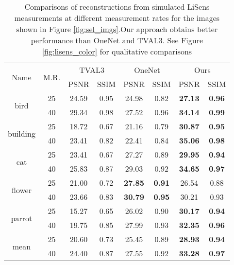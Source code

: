 \documentclass[journal,twoside]{IEEEtran}
\begin{document}
\begin{table}[!h]
\renewcommand{\arraystretch}{1.3}
\caption{Comparisons of reconstructions from simulated LiSens measurements at different measurement rates for the images shown in Figure \ref{fig:sel_imgs}.Our approach obtains better performance than OneNet and TVAL3. See Figure \ref{fig:lisens_color} for qualitative comparisons}
\label{table:licens_sim}
\begin{center}
\begin{tabular}{cccccccc}

\toprule
    \multirow{2}{*}{ Name}&\multirow{2}{*}{M.R.}&\multicolumn{2}{c}{TVAL3}&\multicolumn{2}{c}{OneNet}&\multicolumn{2}{c}{Ours}\\
    \cline{3-8} & &  PSNR & SSIM & PSNR & SSIM  & PSNR & SSIM  \\
\midrule 
 \multirow{2}{*}{bird} & 25 & 24.59 & 0.95 & 24.98 & 0.82 & \textbf{27.13} & \textbf{0.96} \\
& 40 & 29.34 & 0.98 & 27.52 & 0.96 & \textbf{34.14} & \textbf{0.99} \\
\midrule 
 \multirow{2}{*}{building} & 25 & 18.72 & 0.67 & 21.16 & 0.79 & \textbf{30.87} & \textbf{0.95} \\
& 40 & 23.41 & 0.82 & 22.41 & 0.84 & \textbf{35.06} & \textbf{0.98} \\
\midrule 
 \multirow{2}{*}{cat} &25 & 23.41 & 0.67 & 27.27 & 0.89 & \textbf{29.95} & \textbf{0.94} \\
& 40 & 25.83 & 0.87 & 29.03 & 0.92 & \textbf{34.65} & \textbf{0.97} \\
\midrule 
 \multirow{2}{*}{flower} &25 & 21.00 & 0.72 & \textbf{27.85} & \textbf{0.91} & 26.54 & 0.88 \\
& 40 & 23.66 & 0.83 & \textbf{30.79} & \textbf{0.95} & 30.21 & 0.93 \\
\midrule 
 \multirow{2}{*}{parrot} &25 & 15.27 & 0.65 & 26.02 & 0.90 & \textbf{30.17} & \textbf{0.94} \\
& 40 & 19.75 & 0.85 & 27.99 & 0.93 & \textbf{32.35} & \textbf{0.96} \\
\midrule 
 \multirow{2}{*}{mean} &25 & 20.60 & 0.73 & 25.45  & 0.89  & \textbf{28.93} &  \textbf{0.94}\\
& 40 & 24.40 & 0.87 & 27.55  & 0.92 & \textbf{33.28} &  \textbf{0.97} \\
\bottomrule
\end{tabular}
\end{center}
\end{table}
\end{document}
